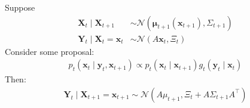 \begin{proposition} \label{prop:gaussian-exact}
    Suppose
    \begin{align*}
        \mathbf{X}_{t} \mid \mathbf{X}_{t+1} &\sim \mathcal{N}\left( \mathbf{\mu}_{t+1}(\mathbf{x}_{t+1}), \Sigma_{t+1} \right)  \\
        \mathbf{Y}_{t} \mid \mathbf{X}_{t} = \mathbf{x}_{t} &\sim \mathcal{N}\left( A\mathbf{x}_{t}, \Xi_{t} \right)
    \end{align*}
    Consider some proposal:
    \begin{align*}
        p_{t}(\mathbf{x}_{t} \mid \mathbf{y}_{t}, \mathbf{x}_{t+1}) \propto p_{t}(\mathbf{x}_{t} \mid \mathbf{x}_{t+1})g_{t}(\mathbf{y}_{t} \mid \mathbf{x}_{t})
    \end{align*}
    Then:
    \begin{align*}
        \mathbf{Y}_{t} \mid \mathbf{X}_{t+1} = \mathbf{x}_{t+1} \sim \mathcal{N}\left( A\mu_{t+1}, \Xi_{t} + A\Sigma_{t+1}A^\top \right) 
    \end{align*}
\end{proposition}
